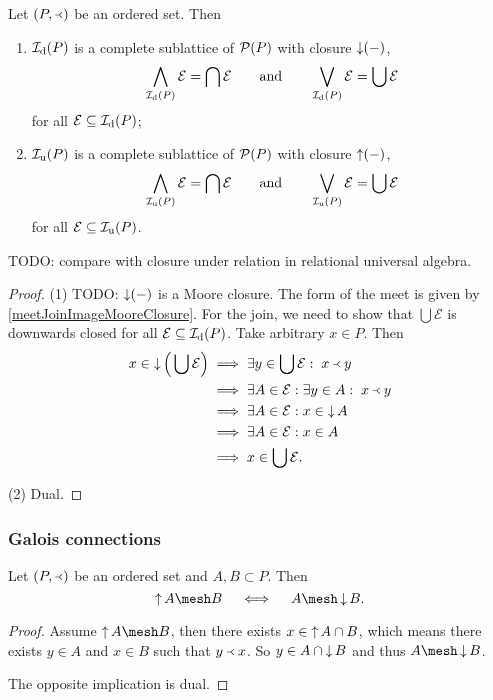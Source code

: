 \begin{proposition} \label{completeLatticeUpDownSets}
Let $\sSet{P,\Yleft}$ be an ordered set. Then
\begin{enumerate}
\item $\operatorname{\mathcal{I}_d}(P)$ is a complete sublattice of $\operatorname{\mathcal{P}}(P)$ with closure $\operatorname{\downarrow}(-)$,
\[ \bigwedge_{\operatorname{\mathcal{I}_d}(P)}\mathcal{E} = \bigcap\mathcal{E} \qquad\text{and}\qquad \bigvee_{\operatorname{\mathcal{I}_d}(P)}\mathcal{E} = \bigcup\mathcal{E} \]
for all $\mathcal{E} \subseteq \operatorname{\mathcal{I}_d}(P)$;
\item $\operatorname{\mathcal{I}_u}(P)$ is a complete sublattice of $\operatorname{\mathcal{P}}(P)$ with closure $\operatorname{\uparrow}(-)$,
\[ \bigwedge_{\operatorname{\mathcal{I}_u}(P)}\mathcal{E} = \bigcap\mathcal{E} \qquad\text{and}\qquad \bigvee_{\operatorname{\mathcal{I}_u}(P)}\mathcal{E} = \bigcup\mathcal{E} \]
for all $\mathcal{E} \subseteq \operatorname{\mathcal{I}_u}(P)$.
\end{enumerate}
\end{proposition}
TODO: compare with closure under relation in relational universal algebra.
\begin{proof}
(1) TODO: $\operatorname{\downarrow}(-)$ is a Moore closure. The form of the meet is given by \ref{meetJoinImageMooreClosure}. For the join, we need to show that $\bigcup\mathcal{E}$ is downwards closed for all $\mathcal{E} \subseteq \operatorname{\mathcal{I}_d}(P)$. Take arbitrary $x\in P$. Then
\begin{align*}
x\in \operatorname{\downarrow}\Big(\bigcup\mathcal{E}\Big) &\implies \exists y \in \bigcup\mathcal{E}:\; x \Yleft y \\
&\implies \exists A\in \mathcal{E}: \exists y \in A:\; x \Yleft y \\
&\implies \exists A\in \mathcal{E}: x \in \operatorname{\downarrow} A \\
&\implies \exists A\in \mathcal{E}: x \in A \\
&\implies x\in \bigcup \mathcal{E}.
\end{align*}

(2) Dual.
\end{proof}

\subsubsection{Galois connections}
\begin{lemma} \label{GaloisConnectionOrderClosure}
Let $\sSet{P, \Yleft}$ be an ordered set and $A,B \subset P$. Then
\[ \upset A \mesh B \quad\iff\quad A\mesh \downset B. \]
\end{lemma}
\begin{proof}
Assume $\upset A \mesh B$, then there exists $x\in \operatorname{\uparrow} A \cap B$, which means there exists $y\in A$ and $x\in B$ such that $y\Yleft x$. So $y\in A\cap \operatorname{\downarrow} B$ and thus $A\mesh \downset B$.

The opposite implication is dual.
\end{proof}

